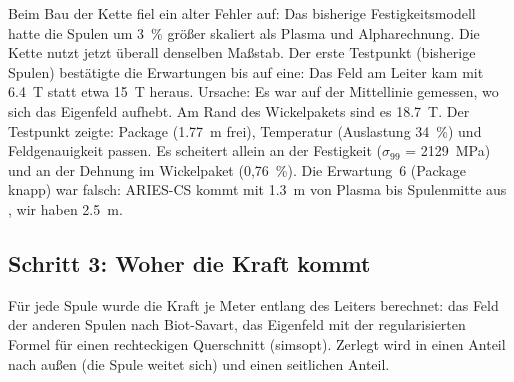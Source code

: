 Beim Bau der Kette fiel ein alter Fehler auf: Das bisherige Festigkeitsmodell hatte die Spulen um 3~\% größer
skaliert als Plasma und Alpharechnung. Die Kette nutzt jetzt überall denselben Maßstab. Der erste Testpunkt
(bisherige Spulen) bestätigte die Erwartungen bis auf eine: Das Feld am Leiter kam mit \SI{6,4}{T} statt etwa
\SI{15}{T} heraus. Ursache: Es war auf der Mittellinie gemessen, wo sich das Eigenfeld aufhebt. Am Rand des
Wickelpakets sind es \SI{18,7}{T}. Der Testpunkt zeigte: Package (\SI{1,77}{m} frei), Temperatur (Auslastung 34~\%)
und Feldgenauigkeit passen. Es scheitert allein an der Festigkeit ($\sigma_{99}$ = \SI{2129}{MPa}) und an der Dehnung im
Wickelpaket (0,76~\%). Die Erwartung~6 (Package knapp) war falsch: ARIES-CS kommt mit \SI{1,3}{m} von Plasma bis
Spulenmitte aus \cite{elguebaly2005}, wir haben \SI{2,5}{m}.

\subsection*{Schritt 3: Woher die Kraft kommt}
Für jede Spule wurde die Kraft je Meter entlang des Leiters berechnet: das Feld der anderen Spulen nach Biot-Savart,
das Eigenfeld mit der regularisierten Formel für einen rechteckigen Querschnitt (simsopt). Zerlegt wird in einen
Anteil nach außen (die Spule weitet sich) und einen seitlichen Anteil.


